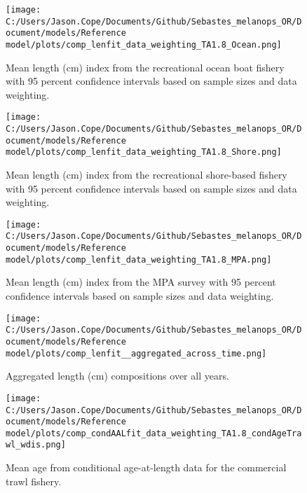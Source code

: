 \documentclass[11pt,
  english,
  letterpaper,
]{article}
\begin{document}
\newpage

\begin{figure}
\centering
\texttt{[image: C:/Users/Jason.Cope/Documents/Github/Sebastes\_melanops\_OR/Document/models/Reference model/plots/comp\_lenfit\_data\_weighting\_TA1.8\_Ocean.png]}
\caption{Mean length (cm) index from the recreational ocean boat fishery with 95 percent confidence intervals based on sample sizes and data weighting.\label{fig:ocean-mean-len-fit}}
\end{figure}

\newpage

\begin{figure}
\centering
\texttt{[image: C:/Users/Jason.Cope/Documents/Github/Sebastes\_melanops\_OR/Document/models/Reference model/plots/comp\_lenfit\_data\_weighting\_TA1.8\_Shore.png]}
\caption{Mean length (cm) index from the recreational shore-based fishery with 95 percent confidence intervals based on sample sizes and data weighting.\label{fig:shore-mean-len-fit}}
\end{figure}

\newpage

\begin{figure}
\centering
\texttt{[image: C:/Users/Jason.Cope/Documents/Github/Sebastes\_melanops\_OR/Document/models/Reference model/plots/comp\_lenfit\_data\_weighting\_TA1.8\_MPA.png]}
\caption{Mean length (cm) index from the MPA survey with 95 percent confidence intervals based on sample sizes and data weighting.\label{fig:mpa-mean-len-fit}}
\end{figure}

\newpage

\begin{figure}
\centering
\texttt{[image: C:/Users/Jason.Cope/Documents/Github/Sebastes\_melanops\_OR/Document/models/Reference model/plots/comp\_lenfit\_\_aggregated\_across\_time.png]}
\caption{Aggregated length (cm) compositions over all years.\label{fig:agg-len-fit}}
\end{figure}

\newpage

\begin{figure}
\centering
\texttt{[image: C:/Users/Jason.Cope/Documents/Github/Sebastes\_melanops\_OR/Document/models/Reference model/plots/comp\_condAALfit\_data\_weighting\_TA1.8\_condAgeTrawl\_wdis.png]}
\caption{Mean age from conditional age-at-length data for the commercial trawl fishery.\label{fig:trawl-mean-caal}}
\end{figure}
\end{document}
